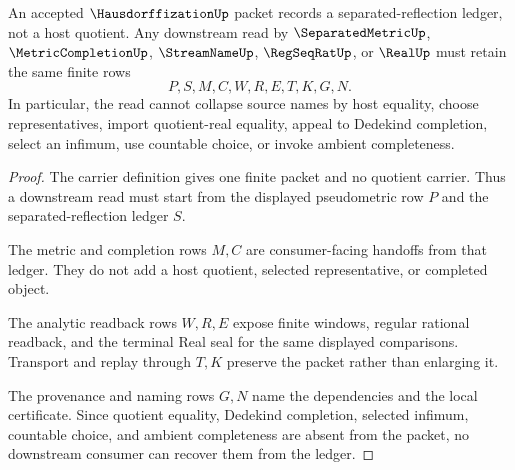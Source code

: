 \begin{theorem}
\label{thm:hausdorffization-ledger-nonquotient-boundary}
An accepted $\HausdorffizationUp$ packet records a separated-reflection ledger, not a host quotient. Any downstream read by $\SeparatedMetricUp$, $\MetricCompletionUp$, $\StreamNameUp$, $\RegSeqRatUp$, or $\RealUp$ must retain the same finite rows
$$
P,S,M,C,W,R,E,T,K,G,N .
$$
In particular, the read cannot collapse source names by host equality, choose representatives, import quotient-real equality, appeal to Dedekind completion, select an infimum, use countable choice, or invoke ambient completeness.
\end{theorem}
\begin{proof}
The carrier definition gives one finite packet and no quotient carrier. Thus a downstream read must start from the displayed pseudometric row $P$ and the separated-reflection ledger $S$.

The metric and completion rows $M,C$ are consumer-facing handoffs from that ledger. They do not add a host quotient, selected representative, or completed object.

The analytic readback rows $W,R,E$ expose finite windows, regular rational readback, and the terminal Real seal for the same displayed comparisons. Transport and replay through $T,K$ preserve the packet rather than enlarging it.

The provenance and naming rows $G,N$ name the dependencies and the local certificate. Since quotient equality, Dedekind completion, selected infimum, countable choice, and ambient completeness are absent from the packet, no downstream consumer can recover them from the ledger.
\end{proof}

